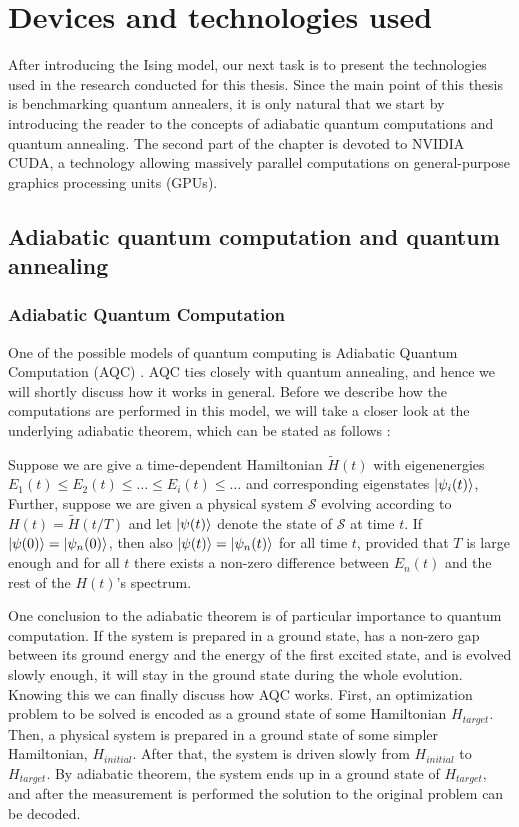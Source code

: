 \chapter{Devices and technologies used}
\label{chapter:near-term}

After introducing the Ising model, our next task is to present the technologies used in the
research conducted for this thesis. Since the main point of this thesis is benchmarking quantum
annealers, it is only natural that we start by introducing the reader to the concepts of adiabatic
quantum computations and quantum annealing. The second part of the chapter is devoted to NVIDIA CUDA, a technology allowing massively parallel computations on general-purpose graphics processing
units (GPUs).


\section{Adiabatic quantum computation and quantum annealing}

\subsection{Adiabatic Quantum Computation}
One of the possible models of quantum computing is Adiabatic Quantum Computation (AQC)
\cite{farhi}. AQC ties closely with quantum annealing, and hence we will shortly discuss how it
works in general. Before we describe how the computations are performed in this model, we will take
a closer look at the underlying adiabatic theorem, which can be stated as follows \cite{farhi,
born}:

\begin{theorem}
Suppose we are give a time-dependent Hamiltonian $\tilde{H}(t)$ with eigenenergies $E_1(t) \le E_2(t) \le
 \ldots \le E_i(t) \le \ldots$ and corresponding eigenstates $\ket{\psi_i(t)}$, Further, suppose we
 are given a physical system $\mathcal{S}$ evolving according to $H(t) = \tilde{H}(t/T)$ and let
 $\ket{\psi(t)}$ denote the state of $\mathcal{S}$ at time $t$. If $\ket{\psi(0)} =
 \ket{\psi_n(0)}$, then also $\ket{\psi(t)} = \ket{\psi_n(t)}$ for all time $t$, provided that $T$ is large
 enough and for all $t$ there
 exists a non-zero difference between $E_n(t)$ and the rest of the $H(t)$'s spectrum.
\end{theorem}

One conclusion to the adiabatic theorem is of particular importance to quantum computation. If the
system is prepared in a ground state, has a non-zero gap between its ground energy and the energy of
the first excited state, and is evolved slowly enough, it will stay in the ground state during the
whole evolution. Knowing this we can finally discuss how AQC works. First, an optimization problem
to be solved is encoded as a ground state of some Hamiltonian $H_{target}$. Then, a physical system
is prepared in a ground state of some simpler Hamiltonian, $H_{initial}$. After that, the system is
driven slowly from $H_{initial}$ to $H_{target}$. By adiabatic theorem, the system ends up in a
ground state of $H_{target}$, and after the measurement is performed the solution to the original
problem can be decoded.

